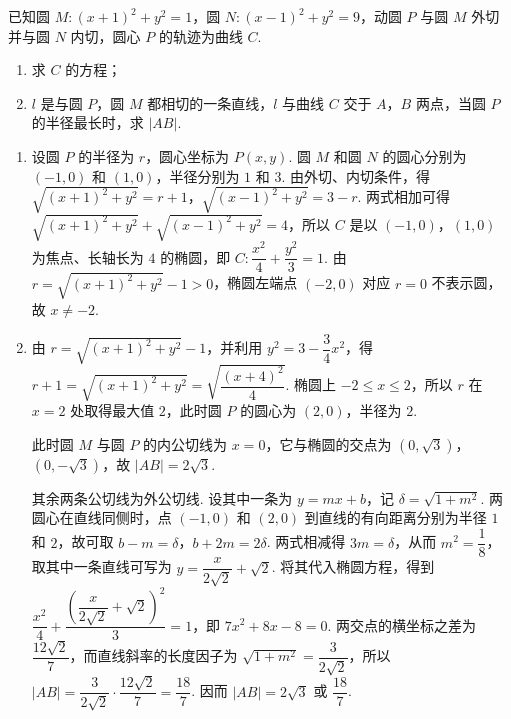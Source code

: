 \begin{problem}
已知圆 \(M: \left(x + 1\right)^2 + y^2 = 1\)，圆 \(N: \left(x - 1\right)^2 + y^2 = 9\)，动圆 \(P\) 与圆 \(M\) 外切并与圆 \(N\) 内切，圆心 \(P\) 的轨迹为曲线 \(C\).
\begin{enumerate}
\item 求 \(C\) 的方程；
\item \(l\) 是与圆 \(P\)，圆 \(M\) 都相切的一条直线，\(l\) 与曲线 \(C\) 交于 \(A\)，\(B\) 两点，当圆 \(P\) 的半径最长时，求 \(|AB|\).
\end{enumerate}
\end{problem}

\begin{solution}
\begin{enumerate}
\item 设圆 \(P\) 的半径为 \(r\)，圆心坐标为 \(P(x,y)\). 圆 \(M\) 和圆 \(N\) 的圆心分别为 \((-1,0)\) 和 \((1,0)\)，半径分别为 \(1\) 和 \(3\). 由外切、内切条件，得
\(\sqrt{(x+1)^2+y^2}=r+1\)，\(\sqrt{(x-1)^2+y^2}=3-r\). 两式相加可得
\(\sqrt{(x+1)^2+y^2}+\sqrt{(x-1)^2+y^2}=4\)，所以 \(C\) 是以 \((-1,0)\)，\((1,0)\) 为焦点、长轴长为 \(4\) 的椭圆，即
\(C:\dfrac{x^2}{4}+\dfrac{y^2}{3}=1\). 由 \(r=\sqrt{(x+1)^2+y^2}-1>0\)，椭圆左端点 \((-2,0)\) 对应 \(r=0\) 不表示圆，故 \(x\neq-2\).

\item 由 \(r=\sqrt{(x+1)^2+y^2}-1\)，并利用 \(y^2=3-\dfrac34x^2\)，得
\(r+1=\sqrt{(x+1)^2+y^2}=\sqrt{\dfrac{(x+4)^2}{4}}\). 椭圆上 \(-2\leqslant x\leqslant2\)，所以 \(r\) 在 \(x=2\) 处取得最大值 \(2\)，此时圆 \(P\) 的圆心为 \((2,0)\)，半径为 \(2\).

此时圆 \(M\) 与圆 \(P\) 的内公切线为 \(x=0\)，它与椭圆的交点为 \((0,\sqrt3)\)，\((0,-\sqrt3)\)，故 \(|AB|=2\sqrt3\).

其余两条公切线为外公切线. 设其中一条为 \(y=mx+b\)，记 \(\delta=\sqrt{1+m^2}\). 两圆心在直线同侧时，点 \((-1,0)\) 和 \((2,0)\) 到直线的有向距离分别为半径 \(1\) 和 \(2\)，故可取
\(b-m=\delta\)，\(b+2m=2\delta\). 两式相减得 \(3m=\delta\)，从而 \(m^2=\dfrac18\)，取其中一条直线可写为 \(y=\dfrac{x}{2\sqrt2}+\sqrt2\). 将其代入椭圆方程，得到
\(\dfrac{x^2}{4}+\dfrac{\left(\dfrac{x}{2\sqrt2}+\sqrt2\right)^2}{3}=1\)，即 \(7x^2+8x-8=0\). 两交点的横坐标之差为 \(\dfrac{12\sqrt2}{7}\)，而直线斜率的长度因子为 \(\sqrt{1+m^2}=\dfrac{3}{2\sqrt2}\)，所以
\(|AB|=\dfrac{3}{2\sqrt2}\cdot\dfrac{12\sqrt2}{7}=\dfrac{18}{7}\). 因而 \(|AB|=2\sqrt3\) 或 \(\dfrac{18}{7}\).
\end{enumerate}
\end{solution}


